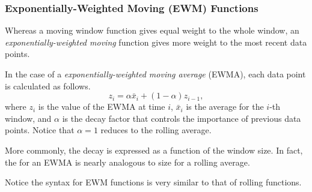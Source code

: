 \subsubsection*{Exponentially-Weighted Moving (EWM) Functions}

Whereas a moving window function gives equal weight to the whole window, an \emph{exponentially-weighted moving} function gives more weight to the most recent data points.

In the case of a \emph{exponentially-weighted moving average} (EWMA), each data point is calculated as follows.
\[
z_i = \alpha \bar{x}_i + (1 - \alpha)z_{i-1},
\]
where $z_i$ is the value of the EWMA at time $i$, $\bar{x}_i$ is the average for the $i$-th window, and $\alpha$ is the decay factor that controls the importance of previous data points.
Notice that $\alpha=1$ reduces to the rolling average.

More commonly, the decay is expressed as a function of the window size.
In fact, the  for an EWMA is nearly analogous to  size for a rolling average.

Notice the syntax for EWM functions is very similar to that of rolling functions.

